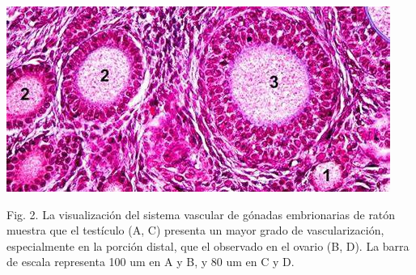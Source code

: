 \documentclass[a0,portrait]{a0poster}
\newcommand{\apartado}[1]{\noindent\fontsize{45pt}{45pt}\selectfont\textcolor[rgb]{0,0,1}{\textbf{\uppercase{#1}}}}
\newcommand{\texto}[1]{\fontsize{30pt}{30pt}\selectfont #1}
\def\myBox#1#2#3{%
 \sbox\PBox{\psframebox[style=boxstyle]{\parbox{#1}{#3}}}%
 \begin{pspicture}(0,-\ht\PBox)(\wd\PBox,1.2\ht\PBox)%
   \rput[l](0,0){\usebox\PBox}
   \rput[l](5\fboxsep,\ht\PBox){\colorbox{white}{#2\hspace{\fboxsep}}}
 \end{pspicture}%
}
\begin{document}
\begin{multicols*}{2}

\begin{center}
\begin{minipage}[t]{\columnwidth}
\includegraphics[width=\textwidth]{fotos/Fig2poster}

\begin{framed}
Fig. 2. La visualización del sistema vascular de gónadas embrionarias de ratón muestra que el testículo (A, C) presenta un mayor grado de vascularización, especialmente en la porción distal, que el observado en el ovario (B, D). La barra de escala representa 100 um en A y B, y 80 um en C y D.\end{framed}
\end{minipage}
\end{center}

\texto{

}


\end{multicols*}
\end{document}
